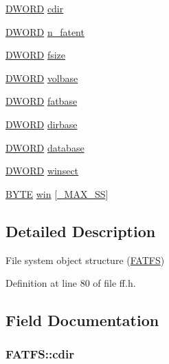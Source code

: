 \begin{DoxyCompactItemize}
\item 
\hyperlink{integer_8h_ad342ac907eb044443153a22f964bf0af}{D\+W\+O\+RD} \hyperlink{structFATFS_a217d0ce0c8cec84aa7f0c142679412c6}{cdir}
\item 
\hyperlink{integer_8h_ad342ac907eb044443153a22f964bf0af}{D\+W\+O\+RD} \hyperlink{structFATFS_a8da50eeba6469bc20d60ca0cf9a1307c}{n\+\_\+fatent}
\item 
\hyperlink{integer_8h_ad342ac907eb044443153a22f964bf0af}{D\+W\+O\+RD} \hyperlink{structFATFS_a53e9560659f14e66f306c2c444198bf3}{fsize}
\item 
\hyperlink{integer_8h_ad342ac907eb044443153a22f964bf0af}{D\+W\+O\+RD} \hyperlink{structFATFS_a8f0ca578755749d204f59dc83f1a7649}{volbase}
\item 
\hyperlink{integer_8h_ad342ac907eb044443153a22f964bf0af}{D\+W\+O\+RD} \hyperlink{structFATFS_a848fba02c4aabe02ef2984e578f33d64}{fatbase}
\item 
\hyperlink{integer_8h_ad342ac907eb044443153a22f964bf0af}{D\+W\+O\+RD} \hyperlink{structFATFS_a3f72fd998dbcce4652a85a81fe944bc4}{dirbase}
\item 
\hyperlink{integer_8h_ad342ac907eb044443153a22f964bf0af}{D\+W\+O\+RD} \hyperlink{structFATFS_a5b6c0bc2e9fd2ae8ef714210a74a2d5d}{database}
\item 
\hyperlink{integer_8h_ad342ac907eb044443153a22f964bf0af}{D\+W\+O\+RD} \hyperlink{structFATFS_ac60e69c00e6bf7c25febfbac4dc1476b}{winsect}
\item 
\hyperlink{integer_8h_a4ae1dab0fb4b072a66584546209e7d58}{B\+Y\+TE} \hyperlink{structFATFS_a7cc35a593465e727ab87723c14610644}{win} \mbox{[}\hyperlink{ffconf_8h_ac271b697378912f17132cb9c7d0de024}{\+\_\+\+M\+A\+X\+\_\+\+SS}\mbox{]}
\end{DoxyCompactItemize}


\subsection{Detailed Description}
File system object structure (\hyperlink{structFATFS}{F\+A\+T\+FS}) 

Definition at line 80 of file ff.\+h.



\subsection{Field Documentation}
\subsubsection[{\texorpdfstring{cdir}{cdir}}]{ F\+A\+T\+F\+S\+::cdir}\hypertarget{structFATFS_a217d0ce0c8cec84aa7f0c142679412c6}{}\label{structFATFS_a217d0ce0c8cec84aa7f0c142679412c6}



